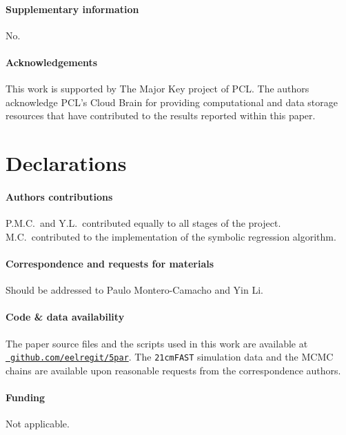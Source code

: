 \paragraph{\large Supplementary information} No.

\paragraph{\large Acknowledgements}
This work is supported by The Major Key project of PCL.
The authors acknowledge PCL's Cloud Brain for providing computational
and data storage resources that have contributed to the results reported
within this paper.

\section*{Declarations}

\paragraph{\large Authors contributions}
P.M.C.\ and Y.L.\ contributed equally to all stages of the project.
M.C.\ contributed to the implementation of the symbolic regression
algorithm.

\vspace{-1em}
\paragraph{\large Correspondence and requests for materials}
Should be addressed to Paulo Montero-Camacho and Yin Li.

\vspace{-1em}
\paragraph{\large Code \& data availability}
The paper source files and the scripts used in this work are available
at \href{https://github.com/eelregit/5par}{\faGithub\
\texttt{github.com/eelregit/5par}}.
The \texttt{21cmFAST} simulation data and the MCMC chains are available
upon reasonable requests from the correspondence authors.

\vspace{-1em}
\paragraph{\large Funding}
Not applicable.

\vspace{-1em}
